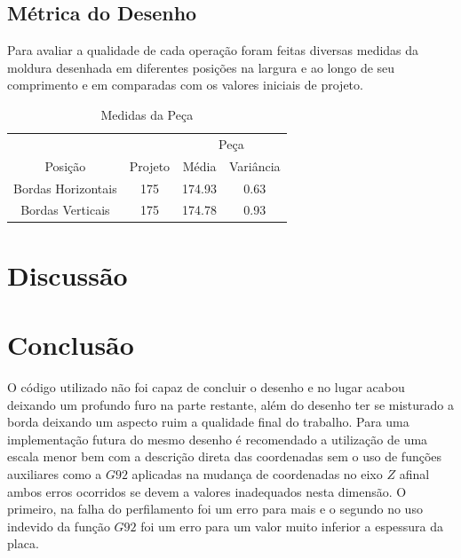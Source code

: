 \documentclass[a4paper,11pt]{article}
\begin{document}
\subsection{Métrica do Desenho}
Para avaliar a qualidade de cada operação foram feitas diversas medidas da moldura desenhada em diferentes posições na largura e ao longo de seu comprimento e em comparadas com os valores iniciais de projeto.

\begin{table}[H]
    \centering
    \begin{tabular}{cccc}
    \hline
        & & \multicolumn{2}{c}{Peça}\\
        Posição & Projeto & Média & Variância\\
    \hline
         Bordas Horizontais & 175 & 174.93 & 0.63\\
         Bordas Verticais & 175 & 174.78 & 0.93\\
    \hline
    \end{tabular}
    \caption{Medidas da Peça}
    \label{tab:my_label}
\end{table}

\section{Discussão}

\section{Conclusão}
O código utilizado não foi capaz de concluir o desenho e no lugar acabou deixando um profundo furo na parte restante, além do desenho ter se misturado a borda deixando um aspecto ruim a qualidade final do trabalho. Para uma implementação futura do mesmo desenho é recomendado a utilização de uma escala menor bem com a descrição direta das coordenadas sem o uso de funções auxiliares como a $G92$ aplicadas na mudança de coordenadas no eixo $Z$ afinal ambos erros ocorridos se devem a valores inadequados nesta dimensão. O primeiro, na falha do perfilamento foi um erro para mais e o segundo no uso indevido da função $G92$ foi um erro para um valor muito inferior a espessura da placa.











\end{document}
